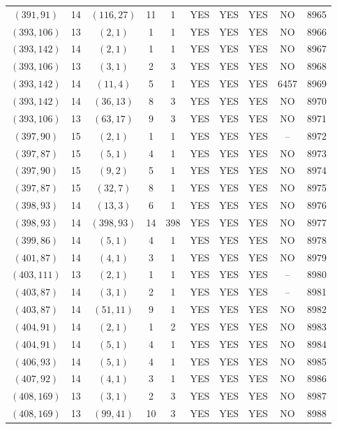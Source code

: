 \begin{longtable}{|c|c|c|c|c|c|c|c|c|c|}
$(391, 91)$ & 14 & $(116, 27)$ & 11 & 1 & YES & YES & YES & NO & 8965\\
$(393, 106)$ & 13 & $(2, 1)$ & 1 & 1 & YES & YES & YES & NO & 8966\\
$(393, 142)$ & 14 & $(2, 1)$ & 1 & 1 & YES & YES & YES & NO & 8967\\
$(393, 106)$ & 13 & $(3, 1)$ & 2 & 3 & YES & YES & YES & NO & 8968\\
$(393, 142)$ & 14 & $(11, 4)$ & 5 & 1 & YES & YES & YES & 6457 & 8969\\
$(393, 142)$ & 14 & $(36, 13)$ & 8 & 3 & YES & YES & YES & NO & 8970\\
$(393, 106)$ & 13 & $(63, 17)$ & 9 & 3 & YES & YES & YES & NO & 8971\\
$(397, 90)$ & 15 & $(2, 1)$ & 1 & 1 & YES & YES & YES & -- & 8972\\
$(397, 87)$ & 15 & $(5, 1)$ & 4 & 1 & YES & YES & YES & NO & 8973\\
$(397, 90)$ & 15 & $(9, 2)$ & 5 & 1 & YES & YES & YES & NO & 8974\\
$(397, 87)$ & 15 & $(32, 7)$ & 8 & 1 & YES & YES & YES & NO & 8975\\
$(398, 93)$ & 14 & $(13, 3)$ & 6 & 1 & YES & YES & YES & NO & 8976\\
$(398, 93)$ & 14 & $(398, 93)$ & 14 & 398 & YES & YES & YES & NO & 8977\\
$(399, 86)$ & 14 & $(5, 1)$ & 4 & 1 & YES & YES & YES & NO & 8978\\
$(401, 87)$ & 14 & $(4, 1)$ & 3 & 1 & YES & YES & YES & NO & 8979\\
$(403, 111)$ & 13 & $(2, 1)$ & 1 & 1 & YES & YES & YES & -- & 8980\\
$(403, 87)$ & 14 & $(3, 1)$ & 2 & 1 & YES & YES & YES & -- & 8981\\
$(403, 87)$ & 14 & $(51, 11)$ & 9 & 1 & YES & YES & YES & NO & 8982\\
$(404, 91)$ & 14 & $(2, 1)$ & 1 & 2 & YES & YES & YES & NO & 8983\\
$(404, 91)$ & 14 & $(5, 1)$ & 4 & 1 & YES & YES & YES & NO & 8984\\
$(406, 93)$ & 14 & $(5, 1)$ & 4 & 1 & YES & YES & YES & NO & 8985\\
$(407, 92)$ & 14 & $(4, 1)$ & 3 & 1 & YES & YES & YES & NO & 8986\\
$(408, 169)$ & 13 & $(3, 1)$ & 2 & 3 & YES & YES & YES & NO & 8987\\
$(408, 169)$ & 13 & $(99, 41)$ & 10 & 3 & YES & YES & YES & NO & 8988\\

\end{longtable}
